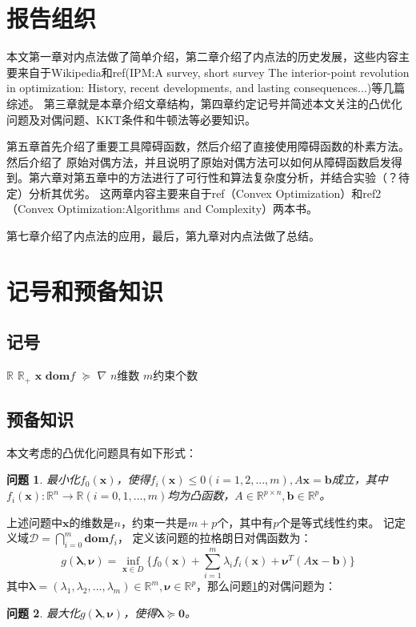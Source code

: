 \documentclass{article}
\newtheorem{problem}{问题}
\begin{document}
\section{报告组织}
本文第一章对内点法做了简单介绍，第二章介绍了内点法的历史发展，这些内容主要来自于Wikipedia和ref(IPM:A survey, short survey The interior-point revolution in optimization: History, recent developments, and lasting consequences...)等几篇综述。
第三章就是本章介绍文章结构，第四章约定记号并简述本文关注的凸优化问题及对偶问题、KKT条件和牛顿法等必要知识。

第五章首先介绍了重要工具障碍函数，然后介绍了直接使用障碍函数的朴素方法。然后介绍了
原始对偶方法，并且说明了原始对偶方法可以如何从障碍函数启发得到。第六章对第五章中的方法进行了可行性和算法复杂度分析，并结合实验（？待定）分析其优劣。
这两章内容主要来自于ref（Convex Optimization）和ref2（Convex Optimization:Algorithms and Complexity）两本书。

第七章介绍了内点法的应用，最后，第九章对内点法做了总结。
\section{记号和预备知识}
\subsection{记号}
$\mathbb{R}$ $\mathbb{R}_+$
$\bm x$ $\textbf{dom}f$
$\succeq$
$\nabla$
$n$维数 $m$约束个数
\subsection{预备知识}
本文考虑的凸优化问题具有如下形式：
\begin{problem}
最小化$f_0(\bm x)$，使得$f_i(\bm x)\le 0(i=1,2,...,m),A\bm x=\bm{b}$成立，其中$f_i(\bm x):\mathbb{R}^n\rightarrow\mathbb{R}(i=0,1,...,m)$均为凸函数，$A\in\mathbb{R}^{p\times n},\bm b\in\mathbb{R}^p$。
\label{general_convex_prob}
\end{problem}

上述问题中$\bm x$的维数是$n$，约束一共是$m+p$个，其中有$p$个是等式线性约束。
记定义域$\mathcal{D}=\bigcap\limits_{i=0}^{m}\textbf{dom}f_i$，
定义该问题的拉格朗日对偶函数为：
\begin{equation}
    g(\bm\lambda, \bm\nu)=\inf_{\bm x\in D}\{f_0(\bm x)+\sum\limits_{i=1}^m\lambda_if_i(\bm x)+\bm\nu^T(A\bm x-\bm b)\}\label{dual_function}
\end{equation}
其中$\bm\lambda=(\lambda_1,\lambda_2,...,\lambda_m)\in\mathbb R^m,\bm\nu\in\mathbb{R}^p$，那么问题\ref{general_convex_prob}的对偶问题为：
\begin{problem}
最大化$g(\bm\lambda,\bm\nu)$，使得$\bm\lambda\succeq\bm 0$。\label{dual_problem}
\end{problem}
\end{document}
